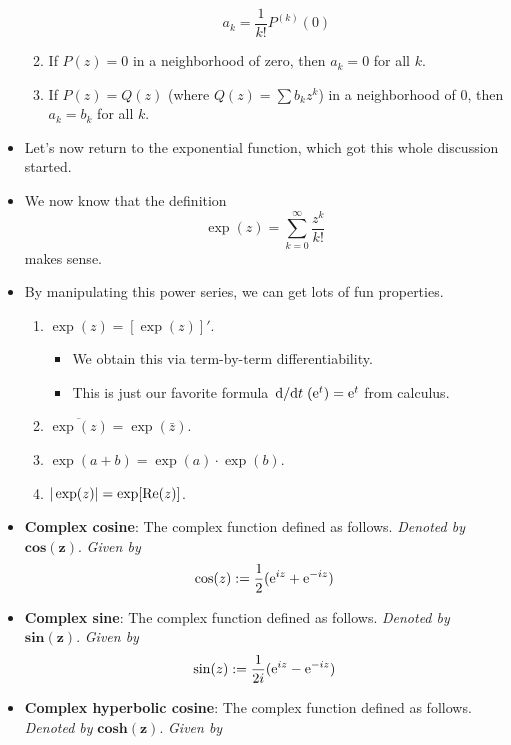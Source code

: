 \documentclass[../notes.tex]{subfiles}
\begin{document}
\begin{itemize}
\begin{enumerate}
\begin{equation*}
            a_k = \frac{1}{k!}P^{(k)}(0)
        \end{equation*}
        \item If $P(z)=0$ in a neighborhood of zero, then $a_k=0$ for all $k$.
        \item If $P(z)=Q(z)$ (where $Q(z)=\sum b_kz^k$) in a neighborhood of 0, then $a_k=b_k$ for all $k$.
    \end{enumerate}
    \item Let's now return to the exponential function, which got this whole discussion started.
    \item We now know that the definition
    \begin{equation*}
        \exp(z) = \sum_{k=0}^\infty\frac{z^k}{k!}
    \end{equation*}
    makes sense.
    \item By manipulating this power series, we can get lots of fun properties.
    \begin{enumerate}
        \item $\exp(z)=[\exp(z)]'$.
        \begin{itemize}
            \item We obtain this via term-by-term differentiability.
            \item This is just our favorite formula $\dv*{t}(\e[t])=\e[t]$ from calculus.
        \end{itemize}
        \item $\overline{\exp(z)}=\exp(\bar{z})$.
        \item $\exp(a+b)=\exp(a)\cdot\exp(b)$.
        \item $|\exp(z)|=\exp[\re(z)]$.
    \end{enumerate}
    \item \textbf{Complex cosine}: The complex function defined as follows. \emph{Denoted by} $\textbf{cos}\bm{(z)}$. \emph{Given by}
    \begin{equation*}
        \cos(z) := \frac{1}{2}(\e[iz]+\e[-iz])
    \end{equation*}
    \item \textbf{Complex sine}: The complex function defined as follows. \emph{Denoted by} $\textbf{sin}\bm{(z)}$. \emph{Given by}
    \begin{equation*}
        \sin(z) := \frac{1}{2i}(\e[iz]-\e[-iz])
    \end{equation*}
    \item \textbf{Complex hyperbolic cosine}: The complex function defined as follows. \emph{Denoted by} $\textbf{cosh}\bm{(z)}$. \emph{Given by}

\end{itemize}
\end{document}

